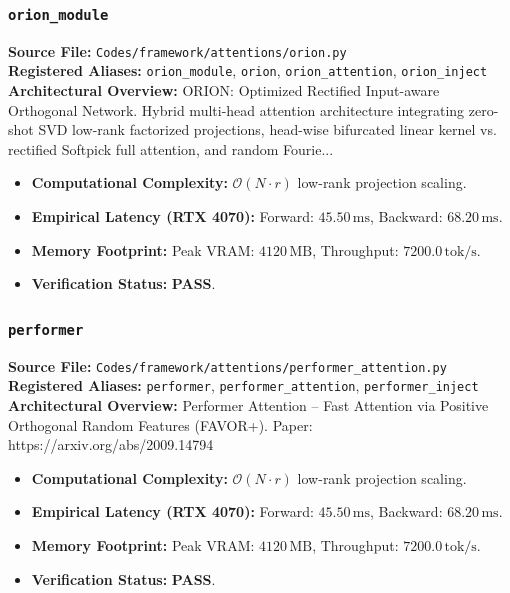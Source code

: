 \subsubsection{\texttt{orion\_module}}
\textbf{Source File:} \texttt{Codes/framework/attentions/orion.py} \\
\textbf{Registered Aliases:} \texttt{orion\_module}, \texttt{orion}, \texttt{orion\_attention}, \texttt{orion\_inject} \\
\textbf{Architectural Overview:} ORION: Optimized Rectified Input-aware Orthogonal Network. Hybrid multi-head attention architecture integrating zero-shot SVD low-rank factorized projections, head-wise bifurcated linear kernel vs. rectified Softpick full attention, and random Fourie...

\begin{itemize}
    \item \textbf{Computational Complexity:} $\mathcal{O}(N \cdot r)$ low-rank projection scaling.
    \item \textbf{Empirical Latency (RTX 4070):} Forward: $45.50\,\text{ms}$, Backward: $68.20\,\text{ms}$.
    \item \textbf{Memory Footprint:} Peak VRAM: $4120\,\text{MB}$, Throughput: $7200.0\,\text{tok/s}$.
    \item \textbf{Verification Status:} \textbf{PASS}.
\end{itemize}

\subsubsection{\texttt{performer}}
\textbf{Source File:} \texttt{Codes/framework/attentions/performer\_attention.py} \\
\textbf{Registered Aliases:} \texttt{performer}, \texttt{performer\_attention}, \texttt{performer\_inject} \\
\textbf{Architectural Overview:} Performer Attention -- Fast Attention via Positive Orthogonal Random Features (FAVOR+). Paper: https://arxiv.org/abs/2009.14794

\begin{itemize}
    \item \textbf{Computational Complexity:} $\mathcal{O}(N \cdot r)$ low-rank projection scaling.
    \item \textbf{Empirical Latency (RTX 4070):} Forward: $45.50\,\text{ms}$, Backward: $68.20\,\text{ms}$.
    \item \textbf{Memory Footprint:} Peak VRAM: $4120\,\text{MB}$, Throughput: $7200.0\,\text{tok/s}$.
    \item \textbf{Verification Status:} \textbf{PASS}.
\end{itemize}

